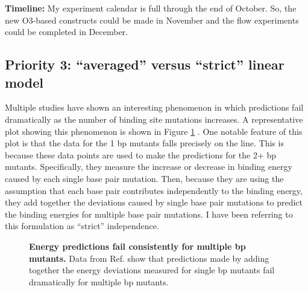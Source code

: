 \documentclass[10pt,letterpaper]{article}
\begin{document}
\noindent \textbf{Timeline:} My experiment calendar is full through the end of October. So, the new O3-based constructs could be made in November and the flow experiments could be completed in December.


\subsection*{Priority 3: ``averaged'' versus ``strict'' linear model}

Multiple studies \cite{Zuo2014, Maerkl2007} have shown an interesting phenomenon in which predictions fail
dramatically as the number of binding site mutations increases. A representative
plot showing this phenomenon is shown in Figure \ref{fig:predict_failure} \cite{Maerkl2007}. One notable feature of this plot is that the data for the
1 bp mutants falls precisely on the line. This is because these data points are
used to make the predictions for the 2+ bp mutants. Specifically, they measure
the increase or decrease in binding energy caused by each single base pair mutation.
Then, because they are using the assumption that each base pair contributes
independently to the binding energy, they add together the deviations caused by
single base pair mutations to predict the binding energies for multiple base pair mutations. I have been referring to this formulation as ``strict''
 independence.\\

\begin{figure}[ht!]
\begin{center}
\caption{\textbf{Energy predictions fail consistently for multiple bp mutants.} Data from Ref. \cite{Maerkl2007} show that predictions made by adding together the energy deviations measured for single bp mutants fail dramatically for multiple bp mutants. }
\label{fig:predict_failure}
\end{center}
\end{figure}
\end{document}
